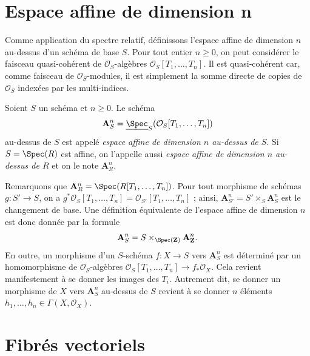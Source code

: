 \section{Espace affine de dimension n}
\label{section-affine-n-space}

\noindent
Comme application du spectre relatif, définissons l'espace affine de
dimension $n$ au-dessus d'un schéma de
base $S$. Pour tout entier $n \geq 0$,
on peut considérer le faisceau quasi-cohérent de $\mathcal{O}_S$-algèbres
$\mathcal{O}_S[T_1, \ldots, T_n]$. Il est quasi-cohérent car, comme faisceau
de $\mathcal{O}_S$-modules, il est simplement la somme directe de copies de
$\mathcal{O}_S$ indexées par les multi-indices.

\begin{definition}
\label{definition-affine-n-space}
Soient $S$ un schéma et $n \geq 0$.
Le schéma
$$
\mathbf{A}^n_S =
\underline{\Spec}_S(\mathcal{O}_S[T_1, \ldots, T_n])
$$
au-dessus de $S$ est appelé {\it espace affine de dimension $n$ au-dessus de $S$}.
Si $S = \Spec(R)$ est affine, on l'appelle aussi
{\it espace affine de dimension $n$ au-dessus de $R$} et on le note $\mathbf{A}^n_R$.
\end{definition}

\noindent
Remarquons que $\mathbf{A}^n_R = \Spec(R[T_1, \ldots, T_n])$.
Pour tout morphisme de schémas $g : S' \to S$, on a
$g^*\mathcal{O}_S[T_1, \ldots, T_n] = \mathcal{O}_{S'}[T_1, \ldots, T_n]$ ;
ainsi, $\mathbf{A}^n_{S'} = S' \times_S \mathbf{A}^n_S$ est le changement
de base. Une définition équivalente de l'espace affine de dimension $n$
est donc donnée par la formule
$$
\mathbf{A}^n_S = S \times_{\Spec(\mathbf{Z})} \mathbf{A}^n_{\mathbf{Z}}.
$$
En outre, un morphisme d'un $S$-schéma $f : X \to S$
vers $\mathbf{A}^n_S$ est déterminé par un homomorphisme de
$\mathcal{O}_S$-algèbres
$\mathcal{O}_S[T_1, \ldots, T_n] \to f_*\mathcal{O}_X$.
Cela revient manifestement à se donner les images des $T_i$.
Autrement dit, se donner un morphisme de $X$ vers $\mathbf{A}^n_S$ au-dessus de $S$
revient à se donner $n$ éléments
$h_1, \ldots, h_n \in \Gamma(X, \mathcal{O}_X)$.

















\section{Fibrés vectoriels}
\label{section-vector-bundle}

